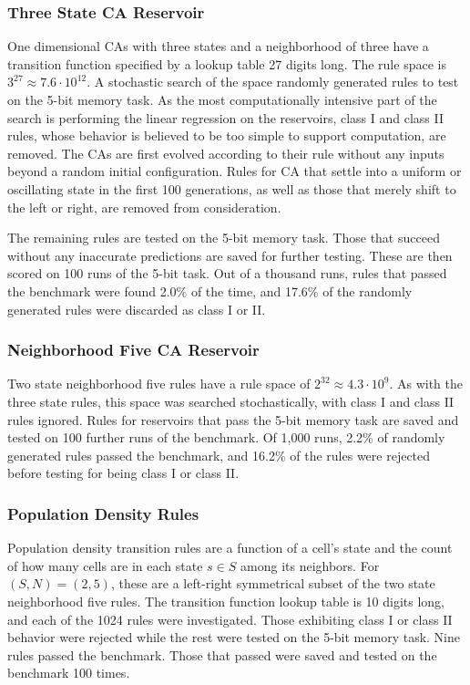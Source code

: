\documentclass{elsarticle}
\begin{document}
\begin{multicols}{2}
	\subsubsection{Three State CA Reservoir}
	One dimensional CAs with three states and a neighborhood of three have a 
	transition function specified by a lookup table 27 digits long. The rule space 
	is $3^{27} \approx 7.6 \cdot 10^{12}$. A stochastic search of the space 
	randomly generated rules to test on the 5-bit memory task. As the most 
	computationally intensive part of the search is performing the linear 
	regression on the reservoirs, class I and class II rules, whose behavior is 
	believed to be too simple to support computation, are removed. The CAs are 
	first evolved according to their rule without any inputs beyond a random 
	initial configuration. Rules for CA that settle into a uniform or oscillating 
	state in the first 100 generations, as well as those that merely shift to the 
	left or right, are removed from consideration.\par
	The remaining rules are tested on the 5-bit memory task.  Those that succeed 
	without any inaccurate predictions are saved for further testing.  These are 
	then scored on 100 runs of the 5-bit task.  Out of a thousand runs, rules that 
	passed the benchmark were found 2.0\% of the time, and 17.6\% of the randomly 
	generated rules were discarded as class I or II.
	
	\subsubsection{Neighborhood Five CA Reservoir}
	Two state neighborhood five rules have a rule space of $2^32 \approx 4.3 \cdot 
	10^9$. As with the three state rules, this space was searched 
	stochastically, with class I and class II rules ignored. Rules for 
	reservoirs that pass the 5-bit memory task are saved and tested on 100 
	further runs of the benchmark. Of 1,000 runs, 2.2\% of randomly generated 
	rules passed the benchmark, and 16.2\% of the rules were rejected before 
	testing for being class I or class II.
	\subsubsection{Population Density Rules}
	Population density transition rules are a function of a cell's state and the 
	count of how many cells are in each state $s \in S$ among its neighbors.  
	For $(S,N) = (2,5)$, these are a left-right symmetrical subset of the two 
	state neighborhood five rules. The transition function lookup table is 10 
	digits long, and each of the 1024 rules were investigated. Those exhibiting 
	class I or class II behavior were rejected while the rest were tested on 
	the 5-bit memory task. Nine rules passed the benchmark. Those that passed 
	were saved and tested on the benchmark 100 times.
	

\end{multicols}
\end{document}
